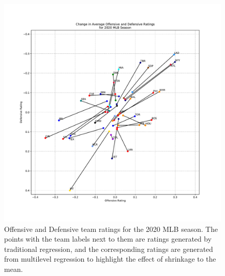\documentclass{uofsthesis-cs}
\begin{document}
\begin{appendices}
\begin{figure}
	\includegraphics[width=\textwidth]{figures/ratings_mlb.pdf}
	\caption{Offensive and Defensive team ratings for the 2020 MLB season. The points with the team labels next to them are ratings generated by traditional regression, and the corresponding ratings are generated from multilevel regression to highlight the effect of shrinkage to the mean.}
\end{figure}


\end{appendices}
\end{document}

